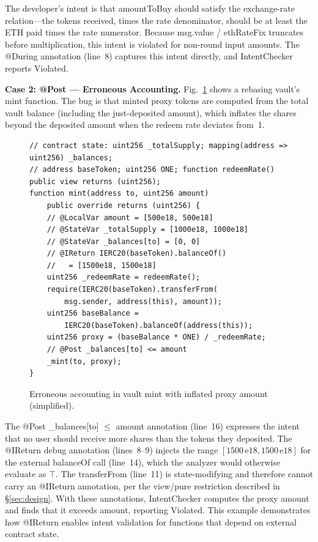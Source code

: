 \documentclass[pdflatex,sn-basic]{sn-jnl}%
\theoremstyle{thmstyleone}%
\theoremstyle{thmstyletwo}%
\theoremstyle{thmstylethree}%
\begin{document}
The developer's intent is that amountToBuy should satisfy the exchange-rate relation---the tokens received, times the rate denominator, should be at least the ETH paid times the rate numerator.
Because msg.value / ethRateFix truncates before multiplication, this intent is violated for non-round input amounts.
The @During annotation (line~8) captures this intent directly, and IntentChecker reports Violated.

\smallskip
\noindent\textbf{Case 2: @Post --- Erroneous Accounting.}
Fig.~\ref{fig:erroneous-accounting-example} shows a rebasing vault's mint function.
The bug is that minted proxy tokens are computed from the total vault balance (including the just-deposited amount), which inflates the shares beyond the deposited amount when the redeem rate deviates from~1.

\begin{figure}[t]
\begin{lstlisting}
// contract state: uint256 _totalSupply; mapping(address => uint256) _balances;
// address baseToken; uint256 ONE; function redeemRate() public view returns (uint256);
function mint(address to, uint256 amount)
    public override returns (uint256) {
    // @LocalVar amount = [500e18, 500e18]
    // @StateVar _totalSupply = [1000e18, 1000e18]
    // @StateVar _balances[to] = [0, 0]
    // @IReturn IERC20(baseToken).balanceOf()
    //   = [1500e18, 1500e18]
    uint256 _redeemRate = redeemRate();
    require(IERC20(baseToken).transferFrom(
        msg.sender, address(this), amount));
    uint256 baseBalance =
        IERC20(baseToken).balanceOf(address(this));
    uint256 proxy = (baseBalance * ONE) / _redeemRate;
    // @Post _balances[to] <= amount
    _mint(to, proxy);
}
\end{lstlisting}
\caption{Erroneous accounting in vault mint with inflated proxy amount (simplified).}
\label{fig:erroneous-accounting-example}
\end{figure}

The @Post \_balances[to] $\leq$ amount annotation (line~16) expresses the intent that no user should receive more shares than the tokens they deposited.
The @IReturn debug annotation (lines~8--9) injects the range $[1500\,\text{e}18, 1500\,\text{e}18]$ for the external balanceOf call (line~14), which the analyzer would otherwise evaluate as $\top$.
The transferFrom (line~11) is state-modifying and therefore cannot carry an @IReturn annotation, per the view/pure restriction described in §\ref{sec:design}.
With these annotations, IntentChecker computes the proxy amount and finds that it exceeds amount, reporting Violated.
This example demonstrates how @IReturn enables intent validation for functions that depend on external contract state.
\end{document}
